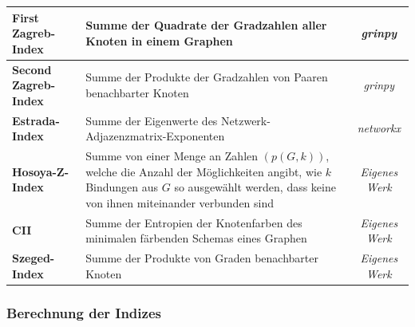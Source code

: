 \begin{table}[H]
\begin{adjustbox}{minipage=\textwidth, center}
\begin{tabularx}{\textwidth}{|l|X|c|}
            \hline
            \textbf{First Zagreb-Index}       & Summe der Quadrate der Gradzahlen aller Knoten in einem Graphen                                                                                                                                                                                          & \textit{grinpy}          \\
            \hline
            \textbf{Second Zagreb-Index}      & Summe der Produkte der Gradzahlen von Paaren benachbarter Knoten                                                                                                                                                                                         & \textit{grinpy}          \\
            \hline
            \textbf{Estrada-Index}            & Summe der Eigenwerte des Netzwerk-Adjazenzmatrix-Exponenten                                                                                                                                                                                              & \textit{networkx}        \\
            \hline
            \textbf{Hosoya-Z-Index}           & Summe von einer Menge an Zahlen $(p(G,k))$, welche die Anzahl der Möglichkeiten angibt, wie $k$ Bindungen aus $G$ so ausgewählt werden, dass keine von ihnen miteinander verbunden sind                                                                  & \textit{Eigenes Werk}    \\
            \hline
            \textbf{CII}                      & Summe der Entropien der Knotenfarben des minimalen färbenden Schemas eines Graphen                                                                                                                                                                       & \textit{Eigenes Werk}    \\
            \hline
            \textbf{Szeged-Index}             & Summe der Produkte von Graden benachbarter Knoten                                                                                                                                                                                                        & \textit{Eigenes Werk}    \\
            \hline
        \end{tabularx}
    \end{adjustbox}
\end{table}

\subsubsection{Berechnung der Indizes}

